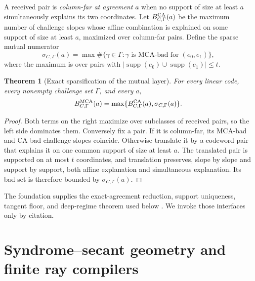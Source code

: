 \documentclass[11pt,a4paper]{amsart}
\numberwithin{equation}{section}
\newtheorem{theorem}{Theorem}[section]
\theoremstyle{remark}
\DeclareMathOperator{\supp}{supp}\DeclareMathOperator{\Fib}{Fib}\DeclareMathOperator{\Sym}{Sym}
\begin{document}
A received pair is \emph{column-far at agreement $a$} when no support of size at least $a$ simultaneously explains its two coordinates.  Let $B^{\rm CA}_{C,\Gamma}(a)$ be the maximum number of challenge slopes whose affine combination is explained on some support of size at least $a$, maximized over column-far pairs.  Define the sparse mutual numerator
\[
 \sigma_{C,\Gamma}(a)=\max\#\{\gamma\in\Gamma:\gamma\text{ is MCA-bad for }(e_0,e_1)\},
\]
where the maximum is over pairs with $|\supp(e_0)\cup\supp(e_1)|\le t$.

\begin{theorem}[Exact sparsification of the mutual layer]\label{thm:exact-sparsification}
For every linear code, every nonempty challenge set $\Gamma$, and every $a$,
\begin{equation}
 B^{\rm MCA}_{C,\Gamma}(a)=
 \max\{B^{\rm CA}_{C,\Gamma}(a),\sigma_{C,\Gamma}(a)\}.\label{eq:exact-sparsification}
\end{equation}
\end{theorem}
\begin{proof}
Both terms on the right maximize over subclasses of received pairs, so the left side dominates them.  Conversely fix a pair.  If it is column-far, its MCA-bad and CA-bad challenge slopes coincide.  Otherwise translate it by a codeword pair that explains it on one common support of size at least $a$.  The translated pair is supported on at most $t$ coordinates, and translation preserves, slope by slope and support by support, both affine explanation and simultaneous explanation.  Its bad set is therefore bounded by $\sigma_{C,\Gamma}(a)$.
\end{proof}

The foundation supplies the exact-agreement reduction, support uniqueness, tangent floor, and deep-regime theorem used below \cite[Secs.~13--14]{CAP25v132}.  We invoke those interfaces only by citation.

\section{Syndrome--secant geometry and finite ray compilers}
\label{sec:syndrome-exact}
\end{document}
